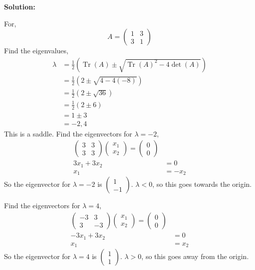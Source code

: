 \documentclass[12pt]{article}
\DeclareMathOperator{\Tr}{Tr}
\newenvironment{solution}{
    \textbf{Solution:}
    
}{
    
    \vspace{2em}
}
\begin{document}
\begin{solution}
    For,
    \[
        A = \begin{pmatrix}
            1 & 3 \\
            3 & 1
        \end{pmatrix}
    \]
    Find the eigenvalues,
    \[
        \begin{aligned}
            \lambda &= \frac{1}{2}(\Tr(A) \pm \sqrt{\Tr(A)^2 - 4 \det(A)}) \\
            &= \frac{1}{2}(2 \pm \sqrt{4 - 4(-8)}) \\
            &= \frac{1}{2}(2 \pm \sqrt{36}) \\
            &= \frac{1}{2}(2 \pm 6) \\
            &= 1 \pm 3 \\
            &= -2, 4
        \end{aligned}
    \]
    This is a saddle. Find the eigenvectors for \(\lambda = -2\),
    \[
        \begin{aligned}
            \begin{pmatrix}
                3 & 3 \\
                3 & 3
            \end{pmatrix} \begin{pmatrix} x_1 \\ x_2 \end{pmatrix} = \begin{pmatrix} 0 \\ 0 \end{pmatrix}\\
            3x_1 + 3x_2 &= 0 \\
            x_1 &= -x_2
        \end{aligned}
    \]
    So the eigenvector for \(\lambda = -2\) is \(\begin{pmatrix} 1 \\ -1 \end{pmatrix}\). \(\lambda < 0 \), so this goes towards the origin.

    Find the eigenvectors for \(\lambda = 4\),
    \[
        \begin{aligned}
            \begin{pmatrix}
                -3 & 3 \\
                3 & -3
            \end{pmatrix} \begin{pmatrix} x_1 \\ x_2 \end{pmatrix} = \begin{pmatrix} 0 \\ 0 \end{pmatrix} \\
            -3x_1 + 3x_2 &= 0 \\
            x_1 &= x_2
        \end{aligned}
    \]
    So the eigenvector for \(\lambda = 4\) is \(\begin{pmatrix} 1 \\ 1 \end{pmatrix}\). \(\lambda > 0 \), so this goes away from the origin.



\end{solution}
\end{document}
